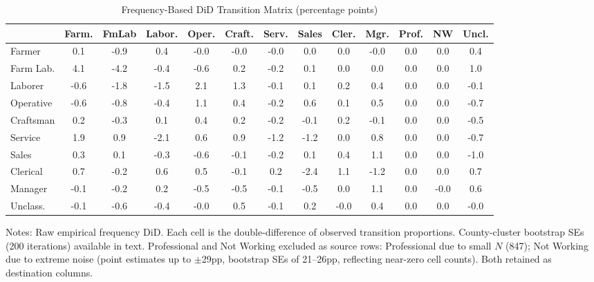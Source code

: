 \documentclass[12pt]{article}
\begin{document}
\begin{table}[H]
\centering
\caption{Frequency-Based DiD Transition Matrix (percentage points)}
\label{tab:freq_matrix}
\begin{adjustbox}{max width=\textwidth}
\begin{threeparttable}
\begin{tabular}{l*{12}{S[table-format=-2.1,table-auto-round]}}
\toprule
& {Farm.} & {FmLab} & {Labor.} & {Oper.} & {Craft.} & {Serv.} & {Sales} & {Cler.} & {Mgr.} & {Prof.} & {NW} & {Uncl.} \\
\midrule
Farmer     &  0.1 & -0.9 &  0.4 & -0.0 & -0.0 & -0.0 &  0.0 &  0.0 & -0.0 & 0.0 &  0.0 &  0.4 \\
Farm Lab.  &  4.1 & -4.2 & -0.4 & -0.6 &  0.2 & -0.2 &  0.1 &  0.0 &  0.0 & 0.0 &  0.0 &  1.0 \\
Laborer    & -0.6 & -1.8 & -1.5 &  2.1 &  1.3 & -0.1 &  0.1 &  0.2 &  0.4 & 0.0 &  0.0 & -0.1 \\
Operative  & -0.6 & -0.8 & -0.4 &  1.1 &  0.4 & -0.2 &  0.6 &  0.1 &  0.5 & 0.0 &  0.0 & -0.7 \\
Craftsman  &  0.2 & -0.3 &  0.1 &  0.4 &  0.2 & -0.2 & -0.1 &  0.2 & -0.1 & 0.0 &  0.0 & -0.5 \\
Service    &  1.9 &  0.9 & -2.1 &  0.6 &  0.9 & -1.2 & -1.2 &  0.0 &  0.8 & 0.0 &  0.0 & -0.7 \\
Sales      &  0.3 &  0.1 & -0.3 & -0.6 & -0.1 & -0.2 &  0.1 &  0.4 &  1.1 & 0.0 &  0.0 & -1.0 \\
Clerical   &  0.7 & -0.2 &  0.6 &  0.5 & -0.1 &  0.2 & -2.4 &  1.1 & -1.2 & 0.0 &  0.0 &  0.7 \\
Manager    & -0.1 & -0.2 &  0.2 & -0.5 & -0.5 & -0.1 & -0.5 &  0.0 &  1.1 & 0.0 & -0.0 &  0.6 \\
Unclass.   & -0.1 & -0.6 & -0.4 & -0.0 &  0.5 & -0.1 &  0.2 & -0.0 &  0.4 & 0.0 &  0.0 & -0.0 \\
\bottomrule
\end{tabular}
\begin{tablenotes}[flushleft]
\small
\item Notes: Raw empirical frequency DiD. Each cell is the double-difference of observed transition proportions. County-cluster bootstrap SEs (200 iterations) available in text. Professional and Not Working excluded as source rows: Professional due to small $N$ (847); Not Working due to extreme noise (point estimates up to $\pm$29pp, bootstrap SEs of 21--26pp, reflecting near-zero cell counts). Both retained as destination columns.
\end{tablenotes}
\end{threeparttable}
\end{adjustbox}
\end{table}
\end{document}
